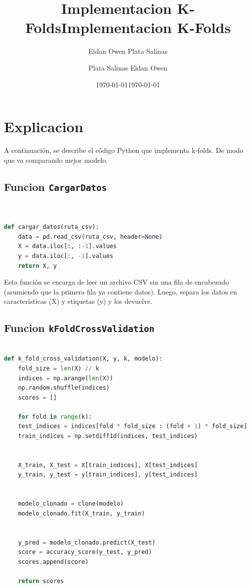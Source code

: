 \documentclass[12pt]{article}
\title{Implementacion K-Folds}
\author{Eidan Owen Plata Salinas}
\date{\today}
\title{Implementacion K-Folds}
\author{Plata Salinas Eidan Owen}
\date{\today}
\begin{document}
\maketitle
\pagebreak



\section*{Explicacion}
A continuación, se describe el código Python que implementa k-folds. De modo que va comparando mejor modelo.
\vspace{1cm}


\subsection*{Funcion \texttt{CargarDatos}}



\vspace{1cm}

\begin{lstlisting}[language=Python]


def cargar_datos(ruta_csv):
	data = pd.read_csv(ruta_csv, header=None)
	X = data.iloc[:, :-1].values
	y = data.iloc[:, -1].values
	return X, y


\end{lstlisting}
\vspace{1cm}

Esta función se encarga de leer un archivo CSV sin una fila de encabezado (asumiendo que la primera fila ya contiene datos). Luego, separa los datos en características (X) y etiquetas (y) y los devuelve.

\vspace{1cm}

\subsection*{Funcion \texttt{kFoldCrossValidation}}
\vspace{1cm}

\begin{lstlisting}[language=Python]

def k_fold_cross_validation(X, y, k, modelo):
	fold_size = len(X) // k
	indices = np.arange(len(X))
	np.random.shuffle(indices)
	scores = []
	
	for fold in range(k):
	test_indices = indices[fold * fold_size : (fold + 1) * fold_size]
	train_indices = np.setdiff1d(indices, test_indices)
	
	
	X_train, X_test = X[train_indices], X[test_indices]
	y_train, y_test = y[train_indices], y[test_indices]
	
	
	modelo_clonado = clone(modelo)
	modelo_clonado.fit(X_train, y_train)
	
	
	y_pred = modelo_clonado.predict(X_test)
	score = accuracy_score(y_test, y_pred)
	scores.append(score)
	
	return scores

\end{lstlisting}
\vspace{1cm}
\end{document}
